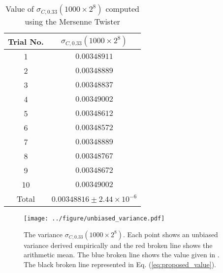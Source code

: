 \documentclass[dvipdfmx,english]{ampmt} %
\begin{document}
%
\begin{table}[tbp]
  \centering
  \caption{Value of $\sigma_{C,0.33}(1000\times 2^8)$ computed using the Mersenne Twister}
  \begin{tabular}{cc} \hline
    Trial No.   & $\sigma_{C,0.33}(1000\times 2^8)$           \\ \hline 
    1           & $0.00348911$       \\
    2           & $0.00348889$       \\
    3           & $0.00348837$       \\ 
    4           & $0.00349002$       \\ 
    5           & $0.00348612$       \\ 
    6           & $0.00348572$       \\ 
    7           & $0.00348889$       \\ 
    8           & $0.00348767$       \\ 
    9           & $0.00348672$       \\ 
    10          & $0.00349002$       \\ \hline 
    Total       & $0.00348816 \pm 2.44 \times 10^{-6}$ \\ \hline
  \end{tabular}
  \label{tab:3}
\end{table}
%
\begin{figure}[tbp]
  \centering
  \texttt{[image: ../figure/unbiased\_variance.pdf]}
  \caption{The variance $\sigma_{C,0.33}(1000\times 2^8)$. Each point shows an unbiased variance derived empirically and the red broken line shows the arithmetic mean. The blue broken line shows the value given in \cite{yamamoto2016highly}. The black broken line represented in Eq. (\ref{eq:proposed_value}).}
  \label{fig:comparison_yamamoto}
\end{figure}
\clearpage
\end{document}
